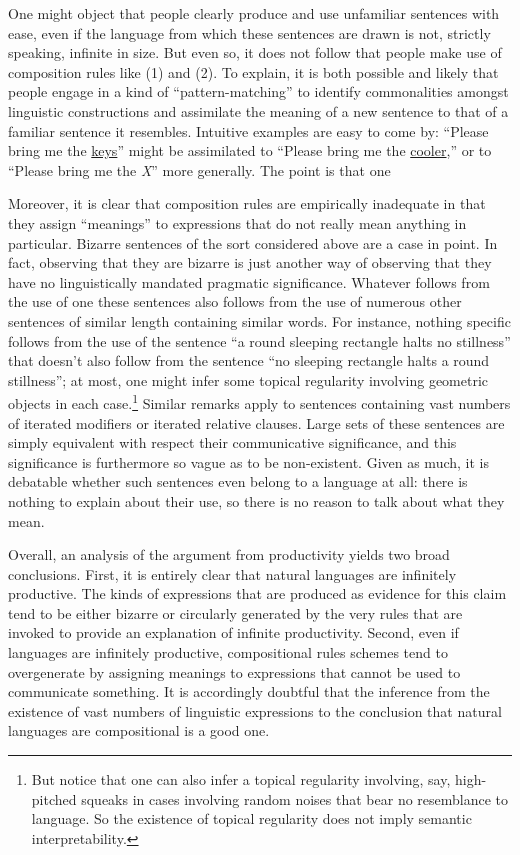 One might object that people clearly produce and use unfamiliar sentences with ease, even if the language from which these sentences are drawn is not, strictly speaking, infinite in size. But even so, it does not follow that people make use of composition rules like (1) and (2). To explain, it is both possible and likely that people engage in a kind of ``pattern-matching'' to identify commonalities amongst linguistic constructions and assimilate the meaning of a new sentence to that of a familiar sentence it resembles. Intuitive examples are easy to come by: ``Please bring me the \underline{keys}'' might be assimilated to ``Please bring me the \underline{cooler},'' or to ``Please bring me the \textit{X}'' more generally. The point is that one 




Moreover, it is clear that composition rules are empirically inadequate in that they assign ``meanings'' to expressions that do not really mean anything in particular. Bizarre sentences of the sort considered above are a case in point. In fact, observing that they are bizarre is just another way of observing that they have no linguistically mandated pragmatic significance. Whatever follows from the use of one these sentences also follows from the use of numerous other sentences of similar length containing similar words. For instance, nothing specific follows from the use of the sentence ``a round sleeping rectangle halts no stillness'' that doesn't also follow from the sentence ``no sleeping rectangle halts a round stillness''; at most, one might infer some topical regularity involving geometric objects in each case.\footnote{But notice that one can also infer a topical regularity involving, say, high-pitched squeaks in cases involving random noises that bear no resemblance to language. So the existence of topical regularity does not imply semantic interpretability.} Similar remarks apply to sentences containing vast numbers of iterated modifiers or iterated relative clauses. Large sets of these sentences are simply equivalent with respect their communicative significance, and this significance is furthermore so vague as to be non-existent. Given as much, it is debatable whether such sentences even belong to a language at all: there is nothing to explain about their use, so there is no reason to talk about what they mean. 

Overall, an analysis of the argument from productivity yields two broad conclusions. First, it is entirely clear that natural languages are infinitely productive. The kinds of expressions that are produced as evidence for this claim tend to be either bizarre or circularly generated by the very rules that are invoked to provide an explanation of infinite productivity. Second, even if languages are infinitely productive, compositional rules schemes tend to overgenerate by assigning meanings to expressions that cannot be used to communicate something. It is accordingly doubtful that the inference from the existence of vast numbers of linguistic expressions to the conclusion that natural languages are compositional is a good one. 

